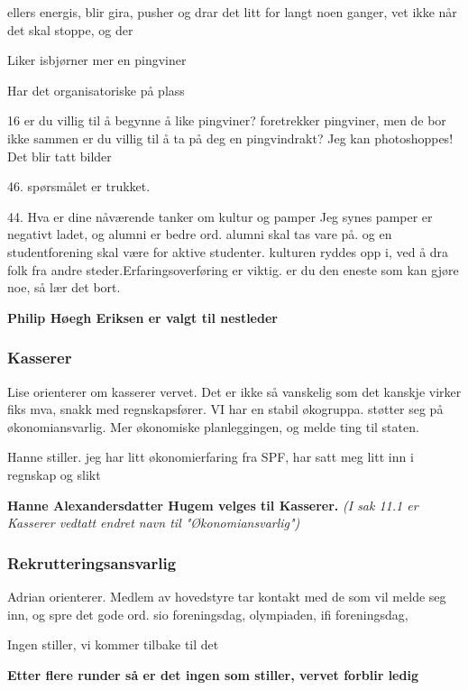 \documentclass[10pt,norsk,a4paper,usenames,dvipsnames]{article}
\begin{document}
        ellers energis, blir gira, pusher og drar det litt for langt noen ganger, vet ikke når det skal stoppe, og der
        
        Liker isbjørner mer en pingviner
        
        Har det organisatoriske på plass
        
        16 er du villig til å begynne å like pingviner?
        foretrekker pingviner, men de bor ikke sammen
        er du villig til å ta på deg en pingvindrakt?
        Jeg kan photoshoppes!
        Det blir tatt bilder
        
        46. spørsmålet er trukket.
        
        44. Hva er dine nåværende tanker om kultur og pamper
        Jeg synes pamper er negativt ladet, og alumni er bedre ord. alumni skal tas vare på. og en studentforening skal være for aktive studenter.  kulturen ryddes opp i, ved å dra folk fra andre steder.Erfaringsoverføring er viktig. er du den eneste som kan gjøre noe, så lær det bort.
        
        \textbf{Philip Høegh Eriksen er valgt til nestleder}
        
        \subsubsection{Kasserer}
        Lise orienterer om kasserer vervet.
        Det er ikke så vanskelig som det kanskje virker
        fiks mva, snakk med regnskapsfører. VI har en stabil økogruppa. støtter seg på økonomiansvarlig. Mer økonomiske planleggingen, og melde ting til staten.
        
        Hanne stiller. jeg har litt økonomierfaring fra SPF, har satt meg litt inn i regnskap og slikt
        
        \textbf{Hanne Alexandersdatter Hugem velges til Kasserer.} \textit{(I sak 11.1 er Kasserer vedtatt endret navn til "Økonomiansvarlig")}
    
        \subsubsection{Rekrutteringsansvarlig}
         Adrian orienterer.
        Medlem av hovedstyre
        tar kontakt med de som vil melde seg inn, og spre det gode ord.
        sio foreningsdag, olympiaden, ifi foreningsdag, 
        
        Ingen stiller, vi kommer tilbake til det
        
        \textbf{Etter flere runder så er det ingen som stiller, vervet forblir ledig}
\end{document}
